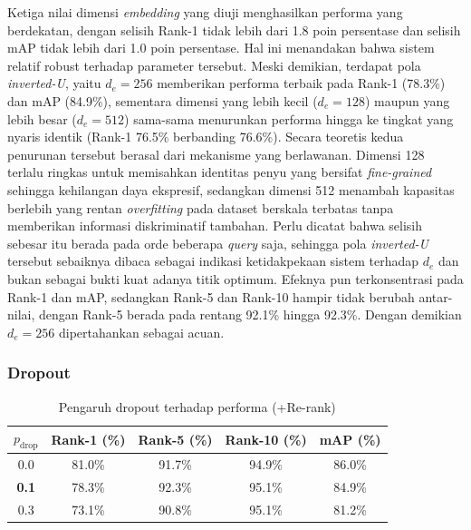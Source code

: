 Ketiga nilai dimensi \textit{embedding} yang diuji menghasilkan performa yang berdekatan, dengan selisih Rank-1 tidak lebih dari 1.8 poin persentase dan selisih mAP tidak lebih dari 1.0 poin persentase. Hal ini menandakan bahwa sistem relatif robust terhadap parameter tersebut. Meski demikian, terdapat pola \textit{inverted-U}, yaitu $d_e=256$ memberikan performa terbaik pada Rank-1 (78.3\%) dan mAP (84.9\%), sementara dimensi yang lebih kecil ($d_e=128$) maupun yang lebih besar ($d_e=512$) sama-sama menurunkan performa hingga ke tingkat yang nyaris identik (Rank-1 76.5\% berbanding 76.6\%). Secara teoretis kedua penurunan tersebut berasal dari mekanisme yang berlawanan. Dimensi 128 terlalu ringkas untuk memisahkan identitas penyu yang bersifat \textit{fine-grained} sehingga kehilangan daya ekspresif, sedangkan dimensi 512 menambah kapasitas berlebih yang rentan \textit{overfitting} pada dataset berskala terbatas tanpa memberikan informasi diskriminatif tambahan. Perlu dicatat bahwa selisih sebesar itu berada pada orde beberapa \textit{query} saja, sehingga pola \textit{inverted-U} tersebut sebaiknya dibaca sebagai indikasi ketidakpekaan sistem terhadap $d_e$ dan bukan sebagai bukti kuat adanya titik optimum. Efeknya pun terkonsentrasi pada Rank-1 dan mAP, sedangkan Rank-5 dan Rank-10 hampir tidak berubah antar-nilai, dengan Rank-5 berada pada rentang 92.1\% hingga 92.3\%. Dengan demikian $d_e=256$ dipertahankan sebagai acuan.

\subsubsection{Dropout}

\begin{table}[H]
    \centering
    \caption{Pengaruh dropout terhadap performa (+Re-rank)}
    \label{tab:var_dropout}
    \renewcommand{\arraystretch}{1.25}
    \begin{tabular}{ccccc}
        \hline
        $p_{\text{drop}}$ & \textbf{Rank-1 (\%)} & \textbf{Rank-5 (\%)} & \textbf{Rank-10 (\%)} & \textbf{mAP (\%)} \\
        \hline
        0{.}0            & 81.0\%               & 91.7\%               & 94.9\%                & 86.0\%             \\
        \textbf{0{.}1}    & 78.3\%               & 92.3\%               & 95.1\%                & 84.9\%            \\
        0{.}3             & 73.1\%               & 90.8\%               & 95.1\%                & 81.2\%            \\
        \hline
    \end{tabular}
\end{table}

